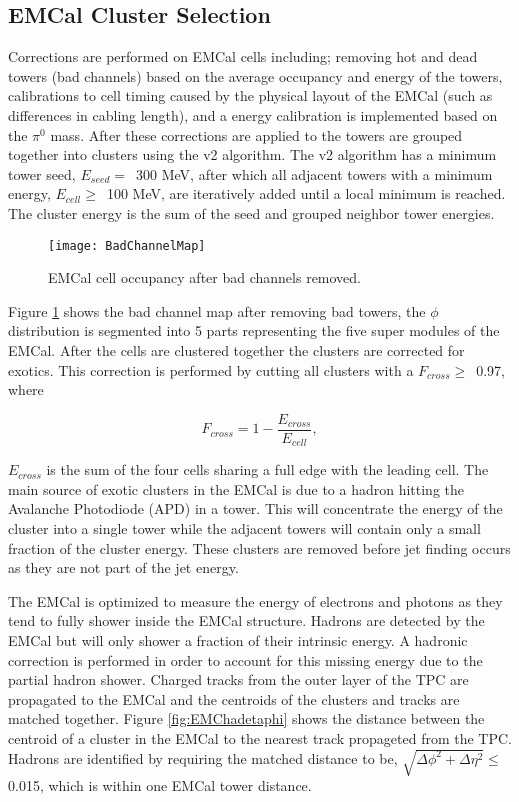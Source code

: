 \subsection{EMCal Cluster Selection}
Corrections are performed on EMCal cells including; removing hot and dead towers (bad channels) based on the average occupancy and energy of the towers, calibrations to cell timing caused by the physical layout of the EMCal (such as differences in cabling length), and a energy calibration is implemented based on the $\pi^{0}$ mass.  After these corrections are applied to the towers are grouped together into clusters using the v2 algorithm.  The v2 algorithm has a minimum tower seed, $E_{seed} = \,$ 300 MeV, after which all adjacent towers with a minimum energy, $E_{cell} \geq \,$ 100 MeV, are iteratively added until a local minimum is reached.  The cluster energy is the sum of the seed and grouped neighbor tower energies.   

\begin{figure}[h]
\texttt{[image: BadChannelMap]}
\centering
\caption{EMCal cell occupancy after bad channels removed.}
\label{fig:badchannel}
\end{figure}


\noindent
Figure \ref{fig:badchannel} shows the bad channel map after removing bad towers, the $\phi$ distribution is segmented into 5 parts representing the five super modules of the EMCal.  After the cells are clustered together the clusters are corrected for exotics.  This correction is performed by cutting all clusters with a $F_{cross} \geq \,$ 0.97, where

\begin{equation}
F_{cross} = 1 - \frac{ E_{cross} }{ E_{cell} },
\label{eq:Fcross}
\end{equation}

\noindent
$E_{cross}$ is the sum of the four cells sharing a full edge with the leading cell.  The main source of exotic clusters in the EMCal is due to a hadron hitting the Avalanche Photodiode (APD) in a tower.  This will concentrate the energy of the cluster into a single tower while the adjacent towers will contain only a small fraction of the cluster energy.  These clusters are removed before jet finding occurs as they are not part of the jet energy.

The EMCal is optimized to measure the energy of electrons and photons as they tend to fully shower inside the EMCal structure.  Hadrons are detected by the EMCal but will only shower a fraction of their intrinsic energy.  A hadronic correction is performed in order to account for this missing energy due to the partial hadron shower.  Charged tracks from the outer layer of the TPC are propagated to the EMCal and the centroids of the clusters and tracks are matched together.  Figure \ref{fig:EMChadetaphi} shows the distance between the centroid of a cluster in the EMCal to the nearest track propageted from the TPC.  Hadrons are identified by requiring the matched distance to be, $\sqrt{ \Delta\phi^{2} + \Delta\eta^{2} } \leq \,$ 0.015, which is within one EMCal tower distance.

